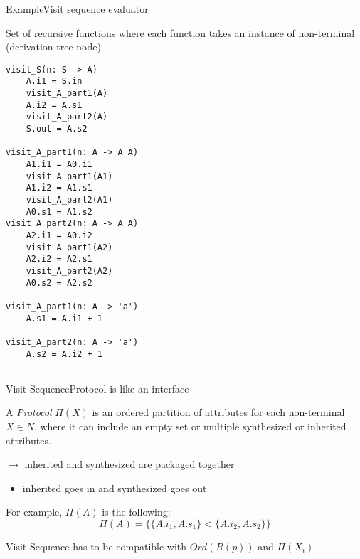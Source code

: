 \begin{frame}[fragile=singleslide]{Example}{Visit sequence evaluator}

Set of \alert{recursive functions} where each function takes an \alert{instance of non-terminal} (derivation tree node)

{\tiny
\begin{multicols}{2}
\begin{Verbatim}[fontsize=\scriptsize]
visit_S(n: S -> A)
    A.i1 = S.in
    visit_A_part1(A)
    A.i2 = A.s1
    visit_A_part2(A)
    S.out = A.s2

visit_A_part1(n: A -> A A)
    A1.i1 = A0.i1
    visit_A_part1(A1)
    A1.i2 = A1.s1
    visit_A_part2(A1)
    A0.s1 = A1.s2
visit_A_part2(n: A -> A A)
    A2.i1 = A0.i2
    visit_A_part1(A2)
    A2.i2 = A2.s1
    visit_A_part2(A2)
    A0.s2 = A2.s2

visit_A_part1(n: A -> 'a')
    A.s1 = A.i1 + 1

visit_A_part2(n: A -> 'a')
    A.s2 = A.i2 + 1
    
\end{Verbatim}
\end{multicols}
}

\end{frame}



\begin{frame}{Visit Sequence}{Protocol is like an interface}

\begin{definition}
A \emph{Protocol} $\Pi(X)$ is an \alert{ordered partition of attributes} for each non-terminal $X \in N$, where it can include an empty set or multiple synthesized or inherited attributes.
\end{definition}

$\rightarrow$ inherited and synthesized are packaged together
\begin{itemize}
    \item \alert{inherited goes in} and \alert{synthesized goes out}
\end{itemize}


For example, $\Pi(A)$ is the following:
\[ \Pi(A) = \Big\{ \{ A.i_1, A.s_1 \} < \{ A.i_2, A.s_2 \} \Big\} \]

Visit Sequence has to be compatible with $\mathit{Ord}(R(p))$ and $\Pi(X_i)$

\end{frame}

